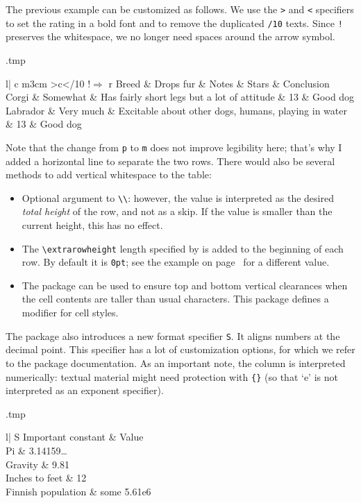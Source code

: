The previous example can be customized as follows.
We use the \verb|>| and \verb|<| specifiers to set the rating in a bold font
and to remove the duplicated \verb|/10| texts.
Since \verb|!| preserves the whitespace,
we no longer need spaces around the arrow symbol.
%
\begin{VerbatimOut}{\jobname.tmp}
\begin{tabular}{l| c m{3cm} >{\bfseries}c<{/10} !{$\Rightarrow$} r}
Breed & Drops fur & Notes & Stars & Conclusion\\
\hline
Corgi & Somewhat & Has fairly short legs but a lot of attitude
    & 13 & Good dog\\
\hline
Labrador & Very much & Excitable about other dogs, humans, playing in water
    & 13 & Good dog
\end{tabular}
\end{VerbatimOut}
\ShowExampleBelow
%
Note that the change from \texttt{p} to \texttt{m} does not improve legibility here;
that's why I added a horizontal line to separate the two rows.
There would also be several methods to add vertical whitespace to the table:
\begin{itemize}
\item Optional argument to \verb|\\|:
    however, the value is interpreted as the desired \emph{total height} of the row,
    and not as a skip.
    If the value is smaller than the current height, this has no effect.
\item The \verb|\extrarowheight| length specified by 
    is added to the beginning of each row.
    By default it is \verb|0pt|;
    see the example on page~\pageref{ex:extrarowheight} for a different value.
\item The  package can be used to ensure top and bottom vertical clearances
    when the cell contents are taller than usual characters.
    This package defines a modifier for cell styles.
\end{itemize}

The  package also introduces a new format specifier \verb|S|.
It aligns numbers at the decimal point.
This specifier has a lot of customization options, for which we refer to the package documentation.
As an important note, the column is interpreted numerically:
textual material might need protection with \verb|{}|
(so that `e' is not interpreted as an exponent specifier).\label{ex:table siunitx}
%
\begin{VerbatimOut}{\jobname.tmp}
\centering
\begin{tabular}{l| S}
Important constant & {Value}\\
\hline
Pi & 3.14159\ldots\\
Gravity & 9.81\\
Inches to feet & 12\\
Finnish population & {some } 5.61e6
\end{tabular}
\end{VerbatimOut}
\ShowExampleBelow[2]

